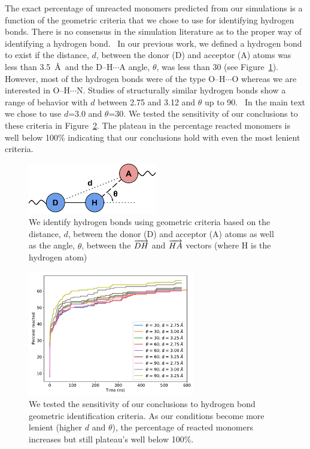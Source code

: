 \documentclass{article}
\begin{document}
  The exact percentage of unreacted monomers predicted from our simulations is a 
  function of the geometric criteria that we chose to use for identifying hydrogen bonds.
  There is no consensus in the simulation literature as to the proper way of identifying
  a hydrogen bond.~\cite{prada-gracia_quest_2013} In our previous work, we 
  defined a hydrogen bond to exist if the distance, $d$, between the donor (D) and acceptor (A)
  atoms was less than 3.5~\AA~and the D--H$\cdots$A angle, $\theta$, was less than 30\degree
  (see Figure~\ref{fig:hbond_geometry}).~\cite{coscia_chemically_2019} However, most
  of the hydrogen bonds were of the type O--H$\cdots$O whereas we are interested in
  O--H$\cdots$N. Studies of structurally similar hydrogen bonds show a range of 
  behavior with $d$ between 2.75 and 3.12 and $\theta$ up to 90\degree.~\cite{taylor_geometry_1984,haynes_hydrogen_2008}
  In the main text we chose to use $d$=3.0 and $\theta$=30\degree. We tested the 
  sensitivity of our conclusions to these criteria in Figure~\ref{fig:sensitivity}. 
  The plateau in the percentage reacted monomers is well below 100\% indicating that our
  conclusions hold with even the most lenient criteria.
  
  \begin{figure}
  \centering
  \includegraphics[width=0.5\textwidth]{hbond_geometry.pdf}
  \caption{We identify hydrogen bonds using geometric criteria based on
  the distance, $d$, between the donor (D) and acceptor (A) atoms as well
  as the angle, $\theta$, between the $\protect\overrightarrow{DH}$ and
  $\protect\overrightarrow{HA}$ vectors (where H is the hydrogen atom)}\label{fig:hbond_geometry}
  \end{figure}
  
  \begin{figure}
  \centering
  \includegraphics[width=0.65\textwidth]{sensitivity.pdf}
  \caption{We tested the sensitivity of our conclusions to hydrogen bond
  geometric identification criteria. As our conditions become more lenient
  (higher $d$ and $\theta$), the percentage of reacted monomers increases
  but still plateau's well below 100\%.}\label{fig:sensitivity}
  \end{figure}  

  \pagebreak
  
\end{document}
